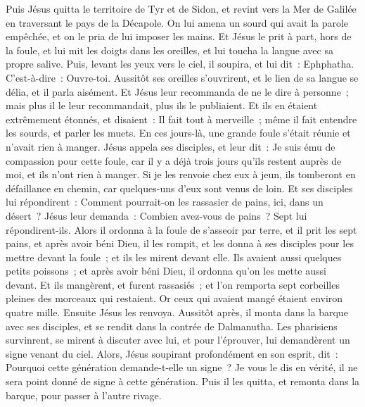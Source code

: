 \begin{multicols}{2}
Puis Jésus quitta le territoire de Tyr et de Sidon, et revint vers la Mer de Galilée en traversant le pays de la Décapole.
On lui amena un sourd qui avait la parole empêchée, et on le pria de lui imposer les mains.
Et Jésus le prit à part, hors de la foule, et lui mit les doigts dans les oreilles, et lui toucha la langue avec sa propre salive.
Puis, levant les yeux vers le ciel, il soupira, et lui dit~: Ephphatha. C'est-à-dire~: Ouvre-toi.
Aussitôt ses oreilles s'ouvrirent, et le lien de sa langue se délia, et il parla aisément.
Et Jésus leur recommanda de ne le dire à personne~; mais plus il le leur recommandait, plus ils le publiaient.
Et ils en étaient extrêmement étonnés, et disaient~: Il fait tout à merveille~; même il fait entendre les sourds, et parler les muets.
\VerseOne{}En ces jours-là, une grande foule s'était réunie et n'avait rien à manger. Jésus appela ses disciples, et leur dit~:
Je suis ému de compassion pour cette foule, car il y a déjà trois jours qu'ils restent auprès de moi, et ils n'ont rien à manger.
Si je les renvoie chez eux à jeun, ils tomberont en défaillance en chemin, car quelques-uns d'eux sont venus de loin.
Et ses disciples lui répondirent~: Comment pourrait-on les rassasier de pains, ici, dans un désert~?
Jésus leur demanda~: Combien avez-vous de pains~? Sept lui répondirent-ils.
Alors il ordonna à la foule de s'asseoir par terre, et il prit les sept pains, et après avoir béni Dieu, il les rompit, et les donna à ses disciples pour les mettre devant la foule~; et ils les mirent devant elle.
Ils avaient aussi quelques petits poissons~; et après avoir béni Dieu, il ordonna qu'on les mette aussi devant.
Et ils mangèrent, et furent rassasiés~; et l'on remporta sept corbeilles pleines des morceaux qui restaient.
Or ceux qui avaient mangé étaient environ quatre mille. Ensuite Jésus les renvoya.
Aussitôt après, il monta dans la barque avec ses disciples, et se rendit dans la contrée de Dalmanutha.
Les pharisiens survinrent, se mirent à discuter avec lui, et pour l'éprouver, lui demandèrent un signe venant du ciel.
Alors, Jésus soupirant profondément en son esprit, dit~: Pourquoi cette génération demande-t-elle un signe~? Je vous le dis en vérité, il ne sera point donné de signe à cette génération.
Puis il les quitta, et remonta dans la barque, pour passer à l'autre rivage.

\end{multicols}
